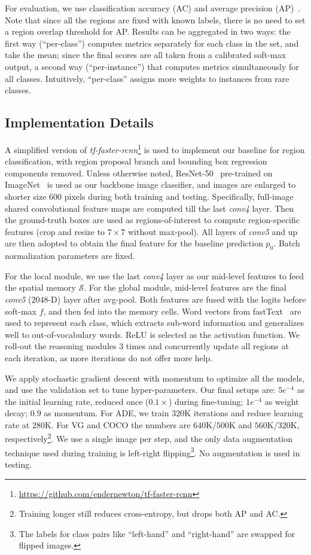 \documentclass[10pt,twocolumn,letterpaper]{article}
\begin{document}
For evaluation, we use classification accuracy (AC) and average precision (AP)~\cite{everingham2010pascal}. Note that since all the regions are fixed with known labels, there is no need to set a region overlap threshold for AP. Results can be aggregated in two ways: the first way (``per-class'') computes metrics separately for each class in the set, and take the mean; since the final scores are all taken from a calibrated soft-max output, a second way (``per-instance'') that computes metrics simultaneously for all classes. Intuitively, ``per-class'' assigns more weights to instances from rare classes.

\subsection{Implementation Details\label{details}}
A simplified version of \emph{tf-faster-rcnn}\footnote{\url{https://github.com/endernewton/tf-faster-rcnn}} is used to implement our baseline for region classification, with region proposal branch and bounding box regression components removed. Unless otherwise noted, ResNet-50~\cite{he2016deep} pre-trained on ImageNet~\cite{russakovsky2015imagenet} is used as our backbone image classifier, and images are enlarged to shorter size $600$ pixels during both training and testing. Specifically, full-image shared convolutional feature maps are computed till the last \emph{conv4} layer. Then the ground-truth boxes are used as regions-of-interest to compute region-specific features (crop and resize to $7{\times}7$ without max-pool). All layers of \emph{conv5} and up are then adopted to obtain the final feature for the baseline prediction $p_0$. Batch normalization parameters are fixed.

For the local module, we use the last \emph{conv4} layer as our mid-level features to feed the spatial memory $\mathcal{S}$. For the global module, mid-level features are the final \emph{conv5} ($2048$-D) layer after avg-pool. Both features are fused with the logits before soft-max $f$, and then fed into the memory cells. Word vectors from fastText~\cite{joulin2016fasttext} are used to represent each class, which extracts sub-word information and generalizes well to out-of-vocabulary words. ReLU is selected as the activation function. We roll-out the reasoning modules $3$ times and concurrently update all regions at each iteration, as more iterations do not offer more help.

We apply stochastic gradient descent with momentum to optimize all the models, and use the validation set to tune hyper-parameters. Our final setups are: $5e^{-4}$ as the initial learning rate, reduced once ($0.1{\times}$) during fine-tuning; $1e^{-4}$ as weight decay; $0.9$ as momentum. For ADE, we train $320$K iterations and reduce learning rate at $280$K. For VG and COCO the numbers are $640$K/$500$K and $560$K/$320$K, respectively\footnote{Training longer still reduces cross-entropy, but drops both AP and AC.}. We use a single image per step, and the only data augmentation technique used during training is left-right flipping\footnote{The labels for class pairs like ``left-hand'' and ``right-hand'' are swapped for flipped images.}. No augmentation is used in testing. 
\end{document}
